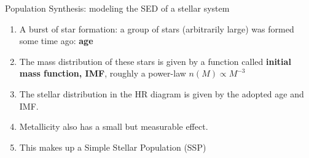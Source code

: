 \documentclass[letterpaper,landscape]{slides}
\begin{document}
\begin{slide}
{		\begin{minipage}[t]{12cm}
			\begin{center}
				\vskip -1in
				{\large \color{red} Population Synthesis: modeling the SED of a stellar system }
				\vskip 0.25in
			\end{center}
			
			
			\begin{enumerate}
				\item {\color{blue} A burst of star formation:} a group of stars (arbitrarily large) 
				was formed some time ago: {\bf age}
				\item {\color{blue} The mass distribution} of these stars is given by a function called
				{\bf initial mass function, IMF}, roughly a power-law $n(M) \propto M^{-3}$
				\item {\color{blue} The stellar distribution in the HR diagram} is given by the adopted
				age and IMF.%
				\item {\color{blue} Metallicity also has a small but measurable effect.}
				\item This makes up a {\color{blue} Simple Stellar Population (SSP)}
			\end{enumerate}
			
	\end{minipage}}
	\vfill 
\end{slide}
\end{document}
